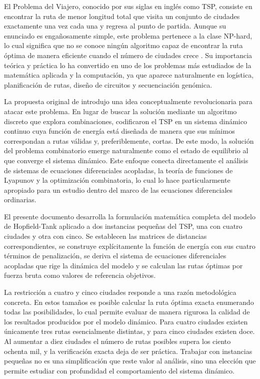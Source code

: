 \documentclass[12pt,a4paper]{article}
\begin{document}
El Problema del Viajero, conocido por sus siglas en inglés como TSP, consiste en encontrar la ruta de menor longitud total que visita un conjunto de ciudades exactamente una vez cada una y regresa al punto de partida. Aunque su enunciado es engañosamente simple, este problema pertenece a la clase NP-hard, lo cual significa que no se conoce ningún algoritmo capaz de encontrar la ruta óptima de manera eficiente cuando el número de ciudades crece \parencite{Karp1972}. Su importancia teórica y práctica lo ha convertido en uno de los problemas más estudiados de la matemática aplicada y la computación, ya que aparece naturalmente en logística, planificación de rutas, diseño de circuitos y secuenciación genómica.

La propuesta original de \textcite{HopfieldTank1985} introdujo una idea conceptualmente revolucionaria para atacar este problema. En lugar de buscar la solución mediante un algoritmo discreto que explora combinaciones, codificaron el TSP en un sistema dinámico continuo cuya función de energía está diseñada de manera que sus mínimos correspondan a rutas válidas y, preferiblemente, cortas. De este modo, la solución del problema combinatorio emerge naturalmente como el estado de equilibrio al que converge el sistema dinámico. Este enfoque conecta directamente el análisis de sistemas de ecuaciones diferenciales acopladas, la teoría de funciones de Lyapunov y la optimización combinatoria, lo cual lo hace particularmente apropiado para un estudio dentro del marco de las ecuaciones diferenciales ordinarias.

El presente documento desarrolla la formulación matemática completa del modelo de Hopfield-Tank aplicado a dos instancias pequeñas del TSP, una con cuatro ciudades y otra con cinco. Se establecen las matrices de distancias correspondientes, se construye explícitamente la función de energía con sus cuatro términos de penalización, se deriva el sistema de ecuaciones diferenciales acopladas que rige la dinámica del modelo y se calculan las rutas óptimas por fuerza bruta como valores de referencia objetivos.

\begin{destacado}
La restricción a cuatro y cinco ciudades responde a una razón metodológica concreta. En estos tamaños es posible calcular la ruta óptima exacta enumerando todas las posibilidades, lo cual permite evaluar de manera rigurosa la calidad de los resultados producidos por el modelo dinámico. Para cuatro ciudades existen únicamente tres rutas esencialmente distintas, y para cinco ciudades existen doce. Al aumentar a diez ciudades el número de rutas posibles supera los ciento ochenta mil, y la verificación exacta deja de ser práctica. Trabajar con instancias pequeñas no es una simplificación que reste valor al análisis, sino una elección que permite estudiar con profundidad el comportamiento del sistema dinámico.
\end{destacado}
\end{document}
